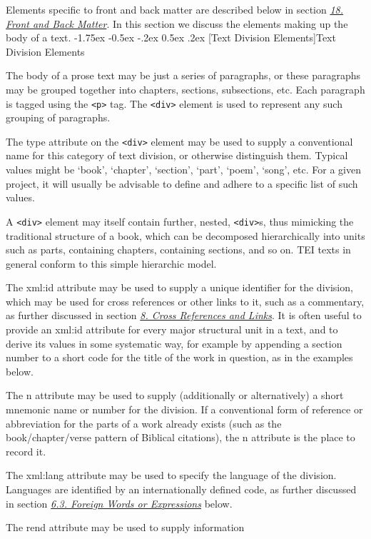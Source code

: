 \documentclass[11pt,twoside]{article}\makeatletter
\makeatletter
\renewcommand\section{\@startsection {section}{1}{\z@}%
     {-1.75ex \@plus -0.5ex \@minus -.2ex}%
     {0.5ex \@plus .2ex}%
     {\reset@font\Large\bfseries\sffamily}}
\renewcommand\subsection{\@startsection{subsection}{2}{\z@}%
     {-1.75ex\@plus -0.5ex \@minus- .2ex}%
     {0.5ex \@plus .2ex}%
     {\reset@font\Large\sffamily}}
\def\DivII{\subsection}
\def\DivII{\section}
\makeatother
\begin{document}
Elements specific to front and back matter are described
below in section \textit{\hyperref[U5-fronbac]{18. Front and Back Matter}}. In this section we discuss
the elements making up the body of a text. 
\DivII[Text Division Elements]{Text Division Elements}\label{divs}\par The body of a prose text may be just a series of paragraphs, or
these paragraphs may be grouped together into chapters, sections,
subsections, etc. Each paragraph is tagged using
the \texttt{<p>} tag. The \texttt{<div>} element is used to represent any
such grouping of paragraphs. 
\par The type attribute on the \texttt{<div>} element may be
used to supply a conventional name for this category of text division,
or otherwise distinguish them.  Typical values might be ‘book’,
‘chapter’, ‘section’, ‘part’, ‘poem’, ‘song’,
etc.  For a given project, it will usually be advisable to define and
adhere to a specific list of such values.  \par A \texttt{<div>} element may itself contain further, nested,
\texttt{<div>}s, thus mimicking the traditional structure of a book,
which can be decomposed hierarchically into units such as parts,
containing chapters, containing sections, and so on. TEI texts in general
conform to this simple hierarchic model.\par  The xml:id attribute may be used to supply a unique
identifier for the division, which may be used for cross references or
other links to it, such as a commentary, as further discussed in
section \textit{\hyperref[U5-ptrs]{8. Cross References and Links}}. It is often useful to provide an
xml:id attribute for every major structural unit in a
text, and to derive its values in some systematic way, for example
by appending a section number to a short code for the title of the
work in question, as in the examples below.\par The n attribute may be used to supply (additionally or
alternatively) a short mnemonic name
or number for the division.  If a conventional form of reference or
abbreviation for the parts of a work already exists (such as the
book/chapter/verse pattern of Biblical citations), the n
attribute is the place to record it.\par The xml:lang attribute may be used to specify the
language of the division.  Languages are identified by an
internationally defined code, as further discussed in section \textit{\hyperref[z636]{6.3. Foreign Words or Expressions}} below.\par The rend attribute may be used to supply information
\end{document}
